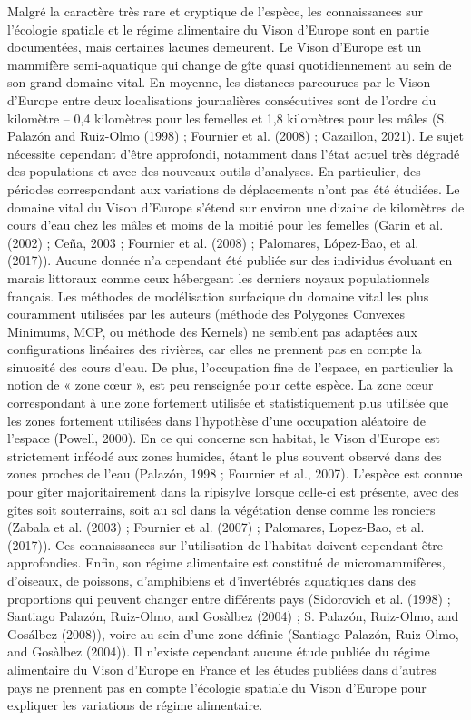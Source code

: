 \documentclass[
  letterpaper,
  DIV=11,
  numbers=noendperiod]{scrreprt}
\begin{document}
Malgré la caractère très rare et cryptique de l'espèce, les
connaissances sur l'écologie spatiale et le régime alimentaire du Vison
d'Europe sont en partie documentées, mais certaines lacunes demeurent.
Le Vison d'Europe est un mammifère semi-aquatique qui change de gîte
quasi quotidiennement au sein de son grand domaine vital. En moyenne,
les distances parcourues par le Vison d'Europe entre deux localisations
journalières consécutives sont de l'ordre du kilomètre -- 0,4 kilomètres
pour les femelles et 1,8 kilomètres pour les mâles (S. Palazón and
Ruiz-Olmo (1998) ; Fournier et al. (2008) ; Cazaillon, 2021). Le sujet
nécessite cependant d'être approfondi, notamment dans l'état actuel très
dégradé des populations et avec des nouveaux outils d'analyses. En
particulier, des périodes correspondant aux variations de déplacements
n'ont pas été étudiées. Le domaine vital du Vison d'Europe s'étend sur
environ une dizaine de kilomètres de cours d'eau chez les mâles et moins
de la moitié pour les femelles (Garin et al. (2002) ; Ceña, 2003 ;
Fournier et al. (2008) ; Palomares, López-Bao, et al. (2017)). Aucune
donnée n'a cependant été publiée sur des individus évoluant en marais
littoraux comme ceux hébergeant les derniers noyaux populationnels
français. Les méthodes de modélisation surfacique du domaine vital les
plus couramment utilisées par les auteurs (méthode des Polygones
Convexes Minimums, MCP, ou méthode des Kernels) ne semblent pas adaptées
aux configurations linéaires des rivières, car elles ne prennent pas en
compte la sinuosité des cours d'eau. De plus, l'occupation fine de
l'espace, en particulier la notion de « zone cœur », est peu renseignée
pour cette espèce. La zone cœur correspondant à une zone fortement
utilisée et statistiquement plus utilisée que les zones fortement
utilisées dans l'hypothèse d'une occupation aléatoire de l'espace
(Powell, 2000). En ce qui concerne son habitat, le Vison d'Europe est
strictement inféodé aux zones humides, étant le plus souvent observé
dans des zones proches de l'eau (Palazón, 1998 ; Fournier et al., 2007).
L'espèce est connue pour gîter majoritairement dans la ripisylve lorsque
celle-ci est présente, avec des gîtes soit souterrains, soit au sol dans
la végétation dense comme les ronciers (Zabala et al. (2003) ; Fournier
et al. (2007) ; Palomares, Lopez-Bao, et al. (2017)). Ces connaissances
sur l'utilisation de l'habitat doivent cependant être approfondies.
Enfin, son régime alimentaire est constitué de micromammifères,
d'oiseaux, de poissons, d'amphibiens et d'invertébrés aquatiques dans
des proportions qui peuvent changer entre différents pays (Sidorovich et
al. (1998) ; Santiago Palazón, Ruiz-Olmo, and Gosàlbez (2004) ; S.
Palazón, Ruiz-Olmo, and Gosálbez (2008)), voire au sein d'une zone
définie (Santiago Palazón, Ruiz-Olmo, and Gosàlbez (2004)). Il n'existe
cependant aucune étude publiée du régime alimentaire du Vison d'Europe
en France et les études publiées dans d'autres pays ne prennent pas en
compte l'écologie spatiale du Vison d'Europe pour expliquer les
variations de régime alimentaire.
\end{document}
